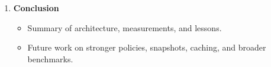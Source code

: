 \begin{enumerate}
    \item \textbf{Conclusion}
    \begin{itemize}
        \item Summary of architecture, measurements, and lessons.
        \item Future work on stronger policies, snapshots, caching, and broader
        benchmarks.
    \end{itemize}
\end{enumerate}
